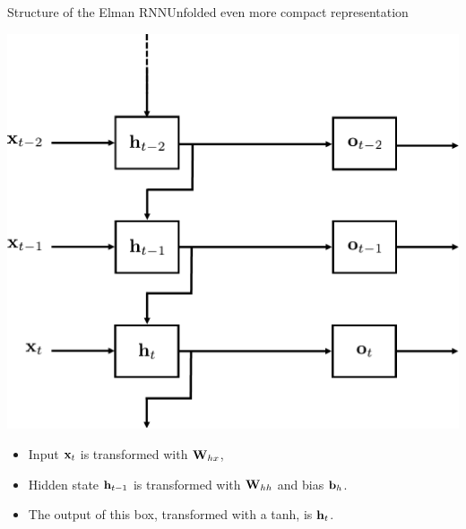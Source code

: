 \documentclass{beamer}
\begin{document}
\begin{frame}{Structure of the Elman RNN}{Unfolded even more compact representation}
\begin{center}
    \includegraphics[scale = 0.35]{Module 5 (RNN)/pics/smaller_rnn_unrolled.pdf}
\end{center}
\begin{itemize}
    \item Input ${\bf x}_t$ is transformed with ${\bf W}_{hx}$,
    \item Hidden state ${\bf h}_{t-1}$ is transformed with ${\bf W}_{hh}$ and bias ${\bf b}_h$.
    \item The output of this box, transformed with a tanh, is ${\bf h}_t$. 
    
\end{itemize}
\end{frame}
\end{document}
